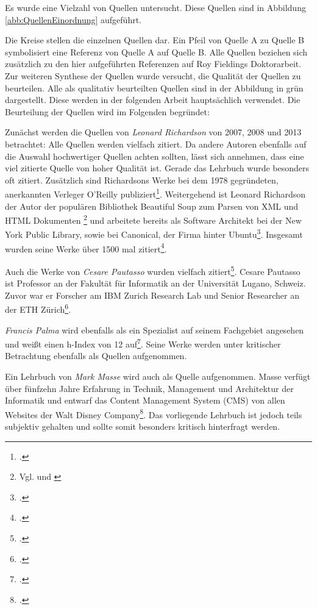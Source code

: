 Es wurde eine Vielzahl von Quellen untersucht. Diese Quellen sind in Abbildung \ref{abb:QuellenEinordnung} aufgeführt. 

Die Kreise stellen die einzelnen Quellen dar. Ein Pfeil von Quelle A zu Quelle B symbolisiert eine Referenz von Quelle A auf Quelle B. Alle Quellen beziehen sich zusätzlich zu den hier aufgeführten Referenzen auf Roy Fieldings Doktorarbeit. Zur weiteren Synthese der Quellen wurde versucht, die Qualität der Quellen zu beurteilen. Alle als qualitativ beurteilten Quellen sind in der Abbildung in grün dargestellt. Diese werden in der folgenden Arbeit hauptsächlich verwendet. Die Beurteilung der Quellen wird im Folgenden begründet:

Zunächst werden die Quellen von \emph{Leonard Richardson} von 2007, 2008 und 2013 betrachtet: Alle Quellen werden vielfach zitiert. Da andere Autoren ebenfalls auf die Auswahl hochwertiger Quellen achten sollten, lässt sich annehmen, dass eine viel zitierte Quelle von hoher Qualität ist. Gerade das Lehrbuch \cite{richardson_restful_2007} wurde besonders oft zitiert. Zusätzlich sind Richardsons Werke bei dem 1978 gegründeten, anerkannten Verleger O’Reilly publiziert\footcite[Vgl. ][S. 1]{levy_trend_2005}. Weitergehend ist Leonard Richardson der Autor der populären  Bibliothek Beautiful Soup zum Parsen von XML und HTML Dokumenten \footnote{Vgl. \cite{richardson_beautifulsoup4_2021} und \cite{richardson_code_2021}} und arbeitete bereits als Software Architekt bei der New York Public Library, sowie bei Canonical, der Firma hinter Ubuntu\footcite[Vgl. ][]{richardson_leonard_2021}. Insgesamt wurden seine Werke über 1500 mal zitiert\footcite[Vgl. ][]{richardson_l_2021}.

Auch die Werke von \emph{Cesare Pautasso} wurden vielfach zitiert\footcite[Vgl. ][]{pautasso_cesare_2021}. Cesare Pautasso ist Professor an der Fakultät für Informatik an der Universität Lugano, Schweiz. Zuvor war er Forscher am IBM Zurich Research Lab und Senior Researcher an der ETH Zürich\footcite[Vgl. ][]{pautasso_prof_2021}.

\emph{Francis Palma} wird ebenfalls als ein Spezialist auf seinem Fachgebiet angesehen und weißt einen h-Index von 12 auf\footcite[Vgl. ][]{palma_francis_2021}. Seine Werke werden unter kritischer Betrachtung ebenfalls als Quellen aufgenommen.

Ein Lehrbuch von \emph{Mark Masse} wird auch als Quelle aufgenommen. Masse verfügt über fünfzehn Jahre Erfahrung in Technik, Management und Architektur der Informatik und entwarf das Content Management System (CMS) von allen Websites der Walt Disney Company\footcite[Vgl. ][]{masse_mark_2021}. Das vorliegende Lehrbuch ist jedoch teils subjektiv gehalten und sollte somit besonders kritisch hinterfragt werden.

